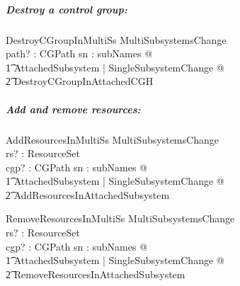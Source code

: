 \documentclass[a4paper,twoside,12pt]{article}
\begin{document}
\subparagraph{Destroy a control group:}

\begin{schema}{DestroyCGroupInMultiSs}
MultiSubsystemsChange \\
path? : CGPath
\where
\forall sn : subNames @ \\
\t1 \exists \Delta AttachedSubsystem | SingleSubsystemChange @ \\
    \t2 DestroyCGroupInAttachedCGH
\end{schema}

\subparagraph{Add and remove resources:}

\begin{schema}{AddResourcesInMultiSs}
MultiSubsystemsChange \\
rs? : ResourceSet \\
cgp? : CGPath
\where
\forall sn : subNames @ \\
\t1 \exists \Delta AttachedSubsystem | SingleSubsystemChange @ \\
    \t2 AddResourcesInAttachedSubsystem
\end{schema}

\begin{schema}{RemoveResourcesInMultiSs}
MultiSubsystemsChange \\
rs? : ResourceSet \\
cgp? : CGPath
\where
\forall sn : subNames @ \\
\t1 \exists \Delta AttachedSubsystem | SingleSubsystemChange @ \\
    \t2 RemoveResourcesInAttachedSubsystem
\end{schema}

\clearpage

\appendix
\end{document}
